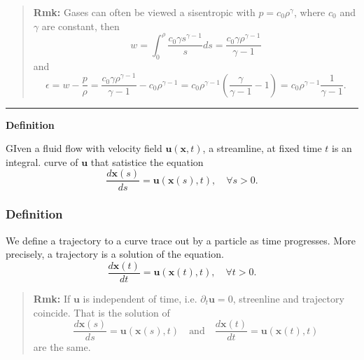 \begin{quote}
	\textbf{Rmk:}
Gases can often be viewed a sisentropic with $p=c_0\rho^\gamma$, where $c_0$ and $\gamma$ are constant, then
\begin{equation}
w = \int_{0}^{\rho} \frac{c_0\gamma s^{\gamma-1}}{s}ds = \frac{c_0\gamma\rho^{\gamma-1}}{\gamma-1}
\end{equation}
and
\begin{equation}
\epsilon = w-\frac{p}{\rho} = \frac{c_0\gamma \rho^{\gamma-1}}{\gamma-1} - c_0\rho^{\gamma-1} = c_0\rho^{\gamma-1}\left(\frac{\gamma}{\gamma-1}-1\right) = c_0\rho^{\gamma-1}\frac{1}{\gamma-1}.
\end{equation}

\end{quote}
\vspace{5pt}
\hrule
\vspace{6pt}

\textbf{Definition}

GIven a fluid flow with velocity field $\textbf{u}(\textbf{x},t)$, a streamline, at fixed time $t$ is an integral. curve of $\textbf{u}$ that satistice the equation
\begin{equation}
\frac{d\textbf{x}(s)}{ds} = \textbf{u}(\textbf{x}(s),t),\quad\forall s>0.
\end{equation}


\subsubsection{Definition} %

We define a trajectory to a curve trace out by a particle as time progresses. More precisely, a trajectory is a solution of the equation.
\begin{equation}
\frac{d\textbf{x}(t)}{dt} = \textbf{u}(\textbf{x}(t),t),\quad\forall t>0.
\end{equation}



\begin{quote}
	\textbf{Rmk:}
If $\textbf{u}$ is independent of time, i.e. $\partial_t \textbf{u} = 0$, streenline and trajectory coincide. That is the solution of
\begin{equation}
\frac{d\textbf{x}(s)}{ds} = \textbf{u}(\textbf{x}(s),t)
\quad\text{and}\quad
\frac{d\textbf{x}(t)}{dt} = \textbf{u}(\textbf{x}(t),t)
\end{equation}
are the same.
\end{quote}

